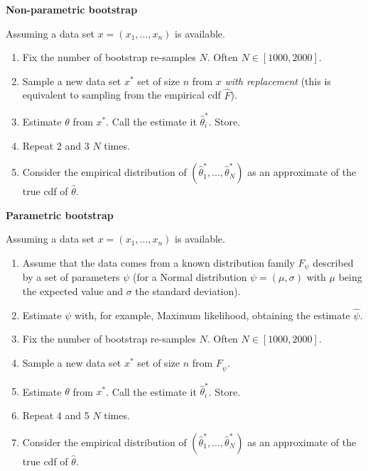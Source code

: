 \documentclass[12pt]{article}
\begin{document}
\begin{framed}
{\bf Non-parametric bootstrap}

Assuming a data set $ x = (x_1,...,x_n)$ is available.

\begin{enumerate}

\item Fix the number of bootstrap re-samples $N$. Often $N \in [1000,2000]$.

\item Sample a new data set $x^*$ set of size $n$ from $x$ \textit{with replacement} (this is equivalent to sampling from the empirical cdf $\hat{F}$).

\item Estimate $\theta$ from $x^*$. Call the estimate it $\hat{\theta}_i^*$. Store.
 
\item Repeat 2 and 3 $N$ times.

\item Consider the empirical distribution of $(\hat{\theta}_1^*,...,\hat{\theta}_N^*)$ as an approximate of the true cdf of $\hat{\theta}$. 

\end{enumerate} 
\end{framed}

\begin{framed}
{\bf Parametric bootstrap}

Assuming a data set $ x = (x_1,...,x_n)$ is available.

\begin{enumerate}

\item Assume that the data comes from a known distribution family $F_{\psi}$ described by a set of parameters $\psi$ (for a Normal distribution $\psi = (\mu,\sigma)$ with $\mu$ being the expected value and $\sigma$ the standard deviation). 

\item Estimate $\psi$ with, for example, Maximum likelihood, obtaining the estimate $\hat{\psi}$.

\item Fix the number of bootstrap re-samples $N$. Often $N \in [1000,2000]$.


\item Sample a new data set $x^*$ set of size $n$ from $F_{\hat{\psi}}$.

\item Estimate $\theta$ from $x^*$. Call the estimate it $\hat{\theta}_i^*$. Store.
 
\item Repeat 4 and 5 $N$ times.

\item Consider the empirical distribution of $(\hat{\theta}_1^*,...,\hat{\theta}_N^*)$ as an approximate of the true cdf of $\hat{\theta}$. 

\end{enumerate} 
\end{framed}
\end{document}
